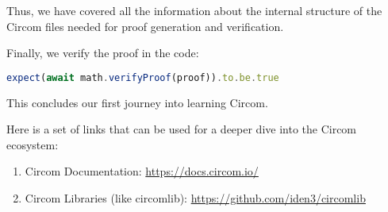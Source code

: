 \documentclass[../lecture-notes-105x135.tex]{subfiles}
\begin{document}
    Thus, we have covered all the information about the internal structure of the Circom files needed for proof generation and verification.

    Finally, we verify the proof in the code:
    \begin{lstlisting}[language=TypeScript,numbers=none,basicstyle=\footnotesize\ttfamily\normalsize]
expect(await math.verifyProof(proof)).to.be.true
    \end{lstlisting}

    This concludes our first journey into learning Circom.

    \begin{remark}
        Here is a set of links that can be used for a deeper dive into the Circom ecosystem:
        \begin{enumerate}
            \item Circom Documentation: \url{https://docs.circom.io/}
            \item Circom Libraries (like circomlib): \url{https://github.com/iden3/circomlib}
        \end{enumerate}
    \end{remark}
\end{document}
